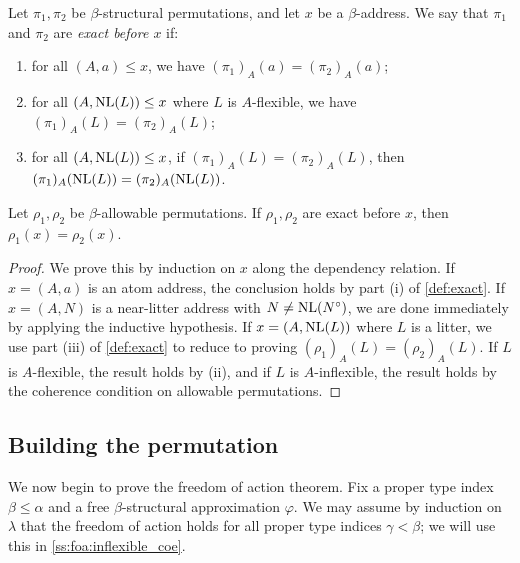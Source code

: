 \begin{definition}
    \label{def:exact}
    Let \( \pi_1, \pi_2 \) be \( \beta \)-structural permutations, and let \( x \) be a \( \beta \)-address.
    We say that \( \pi_1 \) and \( \pi_2 \) are \emph{exact before \( x \)} if:
    \begin{enumerate}
        \item for all \( (A, a) \leq x \), we have \( (\pi_1)_A(a) = (\pi_2)_A(a) \);
        \item for all \( (A, \operatorname{NL}(L)) \leq x \) where \( L \) is \( A \)-flexible, we have \( (\pi_1)_A(L) = (\pi_2)_A(L) \);
        \item for all \( (A, \operatorname{NL}(L)) \leq x \), if \( (\pi_1)_A(L) = (\pi_2)_A(L) \), then \( (\pi_1)_A(\operatorname{NL}(L)) = (\pi_2)_A(\operatorname{NL}(L)) \).
    \end{enumerate}
\end{definition}

\begin{lemma}
    \label{lem:exact}
    Let \( \rho_1, \rho_2 \) be \( \beta \)-allowable permutations.
    If \( \rho_1, \rho_2 \) are exact before \( x \), then \( \rho_1(x) = \rho_2(x) \).
\end{lemma}
\begin{proof}
    We prove this by induction on \( x \) along the dependency relation.
    If \( x = (A, a) \) is an atom address, the conclusion holds by part (i) of \cref{def:exact}.
    If \( x = (A, N) \) is a near-litter address with \( N \neq \operatorname{NL}(N^\circ) \), we are done immediately by applying the inductive hypothesis.
    If \( x = (A, \operatorname{NL}(L)) \) where \( L \) is a litter, we use part (iii) of \cref{def:exact} to reduce to proving \( (\rho_1)_A(L) = (\rho_2)_A(L) \).
    If \( L \) is \( A \)-flexible, the result holds by (ii), and if \( L \) is \( A \)-inflexible, the result holds by the coherence condition on allowable permutations.
\end{proof}

\subsection{Building the permutation}
\label{ss:foa:construction}

We now begin to prove the freedom of action theorem.
Fix a proper type index \( \beta \leq \alpha \) and a free \( \beta \)-structural approximation \( \varphi \).
We may assume by induction on \( \lambda \) that the freedom of action holds for all proper type indices \( \gamma < \beta \); we will use this in \cref{ss:foa:inflexible_coe}.

